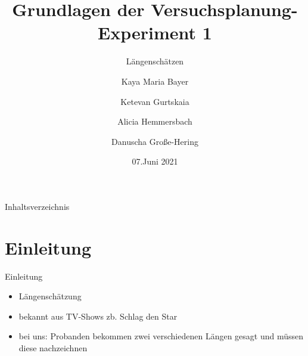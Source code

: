 \documentclass[ ngerman, fontsize= 10pt, headings=big, titlepage=true]{beamer}
\title{Grundlagen der Versuchsplanung-Experiment 1}
\subtitle{Längenschätzen}
\author{Kaya Maria Bayer \and Ketevan Gurtskaia \and Alicia Hemmersbach \and Danuscha Große-Hering}
\date{07.Juni 2021}
\begin{document}
\begin{frame}[plain]
    \maketitle
\end{frame}

\begin{frame}{Inhaltsverzeichnis}
	\tableofcontents
\end{frame}

\section{Einleitung}
\begin{frame}{Einleitung}
\begin{itemize}
\item Längenschätzung
\item bekannt aus TV-Shows zb. Schlag den Star
\item bei uns: Probanden bekommen zwei verschiedenen Längen gesagt und müssen diese nachzeichnen
\end{itemize}
\end{frame}
\end{document}
